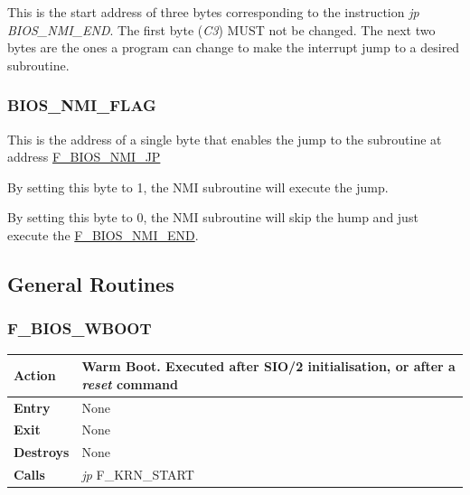 \documentclass[a4paper,11pt]{article}
\begin{document}
    This is the start address of three bytes corresponding to the instruction
    \textit{jp BIOS\_NMI\_END}. The first byte (\textit{C3}) MUST not be changed.
    The next two bytes are the ones a program can change to make the interrupt
    jump to a desired subroutine.

    \subsubsection{BIOS\_NMI\_FLAG}
    \label{func:fbiosnmiflag}

    This is the address of a single byte that enables the jump to the subroutine
    at address \hyperref[func:fbiosnmijp]{F\_BIOS\_NMI\_JP}

    By setting this byte to 1, the NMI subroutine will execute the jump.

    By setting this byte to 0, the NMI subroutine will skip the hump and just
    execute the \hyperref[func:fbiosnmiend]{F\_BIOS\_NMI\_END}.

    \subsection{General Routines}

        \subsubsection{F\_BIOS\_WBOOT}
        \label{func:fbioswboot}
        \begin{tabular}{l p{9cm}}
            \hline\textbf{Action}
            & Warm Boot. Executed after \textbf{SIO/2} initialisation, or after a
            \textit{reset} command \\
            \hline\textbf{Entry} & None \\
            \hline\textbf{Exit} & None \\
            \hline\textbf{Destroys} & None \\
            \hline\textbf{Calls} & \textit{jp} F\_KRN\_START \\
            \hline
        \end{tabular}
\end{document}
